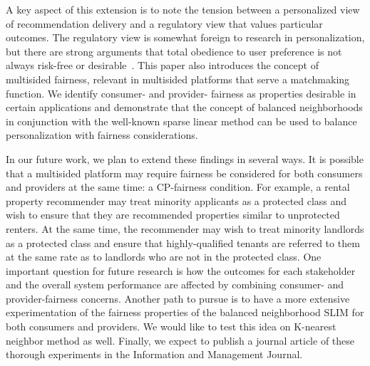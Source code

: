 A key aspect of this extension is to note the tension between a personalized view of recommendation delivery and a regulatory view that values particular outcomes. The regulatory view is somewhat foreign to research in personalization, but there are strong arguments that total obedience to user preference is not always risk-free or desirable~\cite{pariser2011filter,sunstein2009republic}. This paper also introduces the concept of multisided fairness, relevant in multisided platforms that serve a matchmaking function. We identify consumer- and provider- fairness as properties desirable in certain applications and demonstrate that the concept of balanced neighborhoods in conjunction with the well-known sparse linear method can be used to balance personalization with fairness considerations.

In our future work, we plan to extend these findings in several ways. It is possible that a multisided platform may require fairness be considered for both consumers and providers at the same time: a CP-fairness condition. For example, a rental property recommender may treat minority applicants as a protected class and wish to ensure that they are recommended properties similar to unprotected renters. At the same time, the recommender may wish to treat minority landlords as a protected class and ensure that highly-qualified tenants are referred to them at the same rate as to landlords who are not in the protected class. One important question for future research is how the outcomes for each stakeholder and the overall system performance are affected by combining consumer- and provider-fairness concerns.
Another path to pursue is to have a more extensive experimentation of the fairness properties of the balanced neighborhood SLIM for both consumers and providers. We would like to test this idea on K-nearest neighbor method as well. Finally, we expect to publish a journal article of these thorough experiments in the Information and Management Journal.



